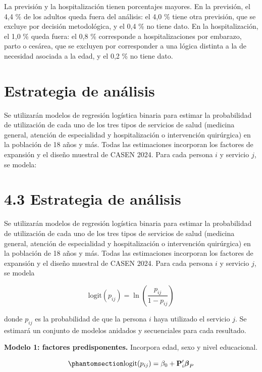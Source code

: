 \documentclass[
  spanish,
  a4paper,
  oneside]{scrbook}
\begin{document}
La previsión y la hospitalización tienen porcentajes mayores. En la
previsión, el 4,4 \% de los adultos queda fuera del análisis: el 4,0 \%
tiene otra previsión, que se excluye por decisión metodológica, y el 0,4
\% no tiene dato. En la hospitalización, el 1,0 \% queda fuera: el 0,8
\% corresponde a hospitalizaciones por embarazo, parto o cesárea, que se
excluyen por corresponder a una lógica distinta a la de necesidad
asociada a la edad, y el 0,2 \% no tiene dato.

\section{Estrategia de análisis}\label{estrategia-de-anuxe1lisis}

Se utilizarán modelos de regresión logística binaria para estimar la
probabilidad de utilización de cada uno de los tres tipos de servicios
de salud (medicina general, atención de especialidad y hospitalización o
intervención quirúrgica) en la población de 18 años y más. Todas las
estimaciones incorporan los factores de expansión y el diseño muestral
de CASEN 2024. Para cada persona \(i\) y servicio \(j\), se modela:

\section{4.3 Estrategia de análisis}\label{estrategia-de-anuxe1lisis-1}

Se utilizarán modelos de regresión logística binaria para estimar la
probabilidad de utilización de cada uno de los tres tipos de servicios
de salud (medicina general, atención de especialidad y hospitalización o
intervención quirúrgica) en la población de 18 años y más. Todas las
estimaciones incorporan los factores de expansión y el diseño muestral
de CASEN 2024. Para cada persona \(i\) y servicio \(j\), se modela

\[
\text{logit}(p_{ij}) = \ln\left(\frac{p_{ij}}{1-p_{ij}}\right)
\]

donde \(p_{ij}\) es la probabilidad de que la persona \(i\) haya
utilizado el servicio \(j\). Se estimará un conjunto de modelos anidados
y secuenciales para cada resultado.

\textbf{Modelo 1: factores predisponentes.} Incorpora edad, sexo y nivel
educacional.

\begin{equation}\protect\phantomsection\label{eq-m1}{
\text{logit}(p_{ij}) = \beta_0 + \mathbf{P}_i'\boldsymbol{\beta}_P
}\end{equation}
\end{document}

